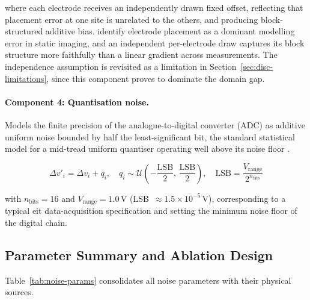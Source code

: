 \noindent where each electrode receives an independently drawn fixed offset, reflecting that placement error at one site is unrelated to the others, and producing block-structured additive bias. \textcite{kolehmainen1997} identify electrode placement as a dominant modelling error in static imaging, and an independent per-electrode draw captures its block structure more faithfully than a linear gradient across measurements. The independence assumption is revisited as a limitation in Section~\ref{sec:disc-limitations}, since this component proves to dominate the domain gap.

\paragraph{Component 4: Quantisation noise.} Models the finite precision of the analogue-to-digital converter (ADC) as additive uniform noise bounded by half the least-significant bit, the standard statistical model for a mid-tread uniform quantiser operating well above its noise floor \parencite{widrow1996quantization}.

\begin{equation}
\Delta v'_i = \Delta v_i + q_i, \quad q_i \sim \mathcal{U}\left(-\frac{\text{LSB}}{2},\, \frac{\text{LSB}}{2}\right), \quad \text{LSB} = \frac{V_{\text{range}}}{2^{n_{\text{bits}}}}
\label{eq:noise-quant}
\end{equation}

\noindent with $n_{\text{bits}} = 16$ and $V_{\text{range}} = 1.0$\,V (LSB~$\approx 1.5 \times 10^{-5}$\,V), corresponding to a typical \gls{eit} data-acquisition specification and setting the minimum noise floor of the digital chain.

\subsection{Parameter Summary and Ablation Design}
\label{sec:method-noise-summary}

Table~\ref{tab:noise-params} consolidates all noise parameters with their physical sources.

